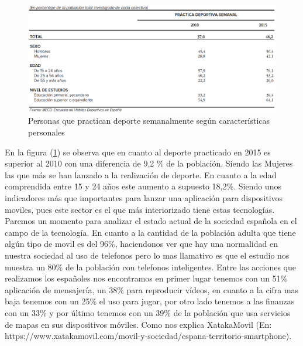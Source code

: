 \documentclass[a4paper, 11pt]{article}
\begin{document}
      \begin{figure}[H]
          \centering
          \includegraphics[width=1\textwidth]{Personas-que-practican-deporte-semanalmente-segun-caracteristicas-personales}
          \caption{Personas que practican deporte semanalmente según características personales}
          \label{f:personas}
      \end{figure}

      En la figura (\ref{f:personas}) se observa que en cuanto al deporte
      practicado en 2015 es superior al 2010 con una diferencia de 9,2 \% de la
      población. Siendo las Mujeres las que más se han lanzado a la realización
      de deporte. En cuanto a la edad comprendida entre 15 y 24 años este aumento
      a supuesto 18,2\%. Siendo unos indicadores más que importantes para lanzar
      una aplicación para dispositivos moviles, pues este sector es el que más
      interiorizado tiene estas tecnologías.\\

      Paremos un momento para analizar el estado actual de la sociedad española
      en el campo de la tecnología. En cuanto a la cantidad de la población adulta
      que tiene algún tipo de movil es del 96\%, haciendonos ver que hay una
      normalidad en nuestra sociedad al uso de telefonos pero lo mas llamativo
      es que el estudio nos muestra un 80\% de la población con telefonos
      inteligentes. Entre las acciones que realizamos los españoles nos
      encontramos en primer lugar tenemos con un 51\% aplicación de mensajería,
      un 38\% para reproducir vídeos, en cuanto a la cifra mas baja tenemos con
      un 25\% el uso para jugar, por otro lado tenemos a las finanzas con un
      33\% y por último tenemos con un 39\% de la población que usa servicios de
      mapas en sus dispositivos móviles. Como nos explica XatakaMovil (En:
      https://www.xatakamovil.com/movil-y-sociedad/espana-territorio-smartphone).\\
\end{document}
